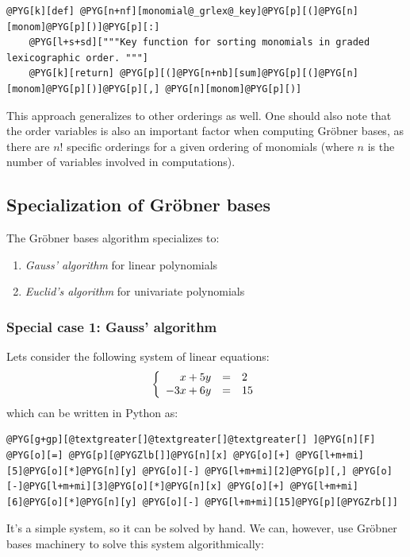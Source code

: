 \begin{Verbatim}[commandchars=@\[\]]
@PYG[k][def] @PYG[n+nf][monomial@_grlex@_key]@PYG[p][(]@PYG[n][monom]@PYG[p][)]@PYG[p][:]
    @PYG[l+s+sd]["""Key function for sorting monomials in graded lexicographic order. """]
    @PYG[k][return] @PYG[p][(]@PYG[n+nb][sum]@PYG[p][(]@PYG[n][monom]@PYG[p][)]@PYG[p][,] @PYG[n][monom]@PYG[p][)]
\end{Verbatim}
\noindent
This approach generalizes to other orderings as well. One should also note that the order variables is
also an important factor when computing Gröbner bases, as there are $n!$ specific orderings for a
given ordering of monomials (where $n$ is the number of variables involved in computations).


\subsection{Specialization of Gröbner bases}

The Gröbner bases algorithm specializes to:
\begin{enumerate}
\item {}
\emph{Gauss' algorithm} for linear polynomials

\item {}
\emph{Euclid's algorithm} for univariate polynomials

\end{enumerate}


\subsubsection{Special case 1: Gauss' algorithm}

Lets consider the following system of linear equations:
\begin{gather}
\begin{split}\left\{
\begin{array}{rcl}
   x + 5 y &=& 2    \\
-3 x + 6 y &=& 15
\end{array}
\right.\end{split}\notag
\end{gather}
which can be written in Python as:

\begin{Verbatim}[commandchars=@\[\]]
@PYG[g+gp][@textgreater[]@textgreater[]@textgreater[] ]@PYG[n][F] @PYG[o][=] @PYG[p][@PYGZlb[]]@PYG[n][x] @PYG[o][+] @PYG[l+m+mi][5]@PYG[o][*]@PYG[n][y] @PYG[o][-] @PYG[l+m+mi][2]@PYG[p][,] @PYG[o][-]@PYG[l+m+mi][3]@PYG[o][*]@PYG[n][x] @PYG[o][+] @PYG[l+m+mi][6]@PYG[o][*]@PYG[n][y] @PYG[o][-] @PYG[l+m+mi][15]@PYG[p][@PYGZrb[]]
\end{Verbatim}
\noindent
It's a simple system, so it can be solved by hand. We can, however, use Gröbner bases
machinery to solve this system algorithmically:

